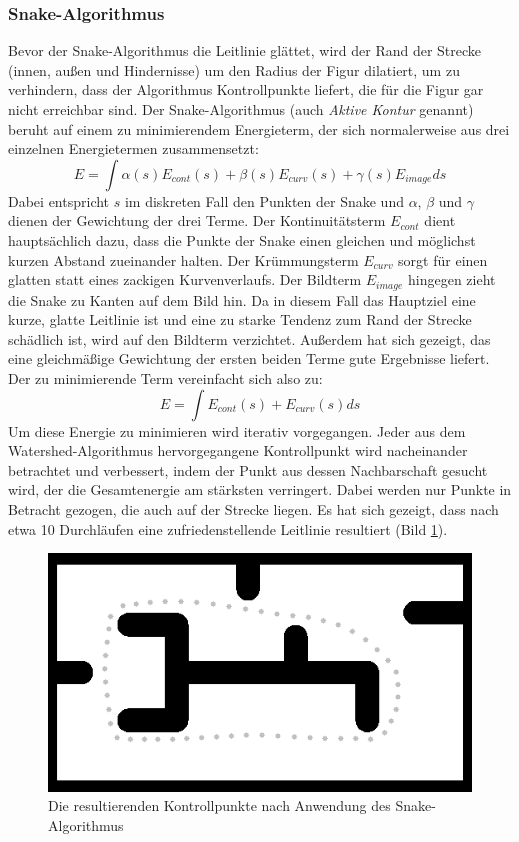 \documentclass[11pt,final,journal,a4paper,towside,towcolumn]{IEEEtran}
\begin{document}
\subsubsection{Snake-Algorithmus}
Bevor der Snake-Algorithmus die Leitlinie glättet, wird der Rand der Strecke (innen, außen und Hindernisse) um den Radius der Figur dilatiert, um zu verhindern, dass der Algorithmus Kontrollpunkte liefert, die für die Figur gar nicht erreichbar sind.
Der Snake-Algorithmus (auch \emph{Aktive Kontur} genannt) beruht auf einem zu minimierendem Energieterm, der sich normalerweise aus drei einzelnen Energietermen zusammensetzt:
\begin{equation}
E = \int\alpha(s)E_{cont}(s)+\beta(s)E_{curv}(s)+\gamma(s)E_{image}ds
\end{equation}
Dabei entspricht $s$ im diskreten Fall den Punkten der Snake und $\alpha$,  $\beta$ und $\gamma$ dienen der Gewichtung der drei Terme. Der Kontinuitätsterm $E_{cont}$ dient hauptsächlich dazu, dass die Punkte der Snake einen gleichen und möglichst kurzen Abstand zueinander halten. Der Krümmungsterm $E_{curv}$ sorgt für einen glatten statt eines zackigen Kurvenverlaufs. Der Bildterm $E_{image}$ hingegen zieht die Snake zu Kanten auf dem Bild hin. Da in diesem Fall das Hauptziel eine kurze, glatte Leitlinie ist und eine zu starke Tendenz zum Rand der Strecke schädlich ist, wird auf den Bildterm verzichtet. Außerdem hat sich gezeigt, das eine gleichmäßige Gewichtung der ersten beiden Terme gute Ergebnisse liefert. Der zu minimierende Term vereinfacht sich also zu:
\begin{equation}
E = \int E_{cont}(s)+E_{curv}(s)ds
\end{equation}
Um diese Energie zu minimieren wird iterativ vorgegangen. Jeder aus dem Watershed-Algorithmus hervorgegangene Kontrollpunkt wird nacheinander betrachtet und verbessert, indem der Punkt aus dessen Nachbarschaft gesucht wird, der die Gesamtenergie am stärksten verringert. Dabei werden nur Punkte in Betracht gezogen, die auch auf der Strecke liegen. Es hat sich gezeigt, dass nach etwa 10 Durchläufen eine zufriedenstellende Leitlinie resultiert (Bild \ref{fig-snake}).
\begin{figure}
	\centering
	\includegraphics[width=\columnwidth]{snake_result.png}
	\caption[Snake-Ergebnis]{Die resultierenden Kontrollpunkte nach Anwendung des Snake-Algorithmus}
	\label{fig-snake}
\end{figure}
\end{document}
